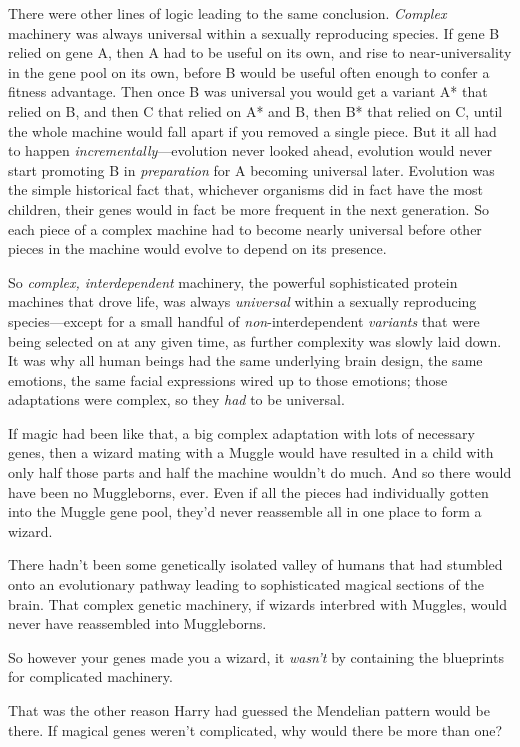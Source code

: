 There were other lines of logic leading to the same conclusion. \emph{Complex}
machinery was always universal within a sexually reproducing species. If gene B
relied on gene A, then A had to be useful on its own, and rise to
near-universality in the gene pool on its own, before B would be useful often
enough to confer a fitness advantage. Then once B was universal you would get a
variant A* that relied on B, and then C that relied on A* and B, then B* that
relied on C, until the whole machine would fall apart if you removed a single
piece. But it all had to happen \emph{incrementally}---evolution never looked
ahead, evolution would never start promoting B in \emph{preparation} for A
becoming universal later. Evolution was the simple historical fact that,
whichever organisms did in fact have the most children, their genes would in
fact be more frequent in the next generation. So each piece of a complex
machine had to become nearly universal before other pieces in the machine would
evolve to depend on its presence.

So \emph{complex, interdependent} machinery, the powerful sophisticated protein
machines that drove life, was always \emph{universal} within a sexually
reproducing species---except for a small handful of \emph{non}-interdependent
\emph{variants} that were being selected on at any given time, as further
complexity was slowly laid down. It was why all human beings had the same
underlying brain design, the same emotions, the same facial expressions wired
up to those emotions; those adaptations were complex, so they \emph{had} to be
universal.

If magic had been like that, a big complex adaptation with lots of necessary
genes, then a wizard mating with a Muggle would have resulted in a child with
only half those parts and half the machine wouldn't do much. And so there would
have been no Muggleborns, ever. Even if all the pieces had individually gotten
into the Muggle gene pool, they'd never reassemble all in one place to form a
wizard.

There hadn't been some genetically isolated valley of humans that had stumbled
onto an evolutionary pathway leading to sophisticated magical sections of the
brain. That complex genetic machinery, if wizards interbred with Muggles, would
never have reassembled into Muggleborns.

So however your genes made you a wizard, it \emph{wasn't} by containing the
blueprints for complicated machinery.

That was the other reason Harry had guessed the Mendelian pattern would be
there. If magical genes weren't complicated, why would there be more than one?

